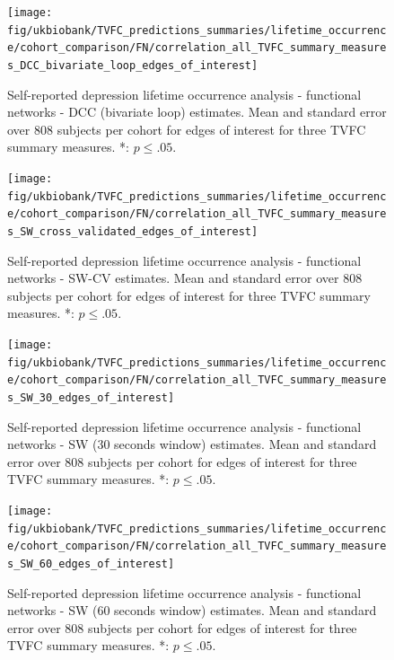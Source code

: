 \begin{figure}[h]
    \centering
    \texttt{[image: fig/ukbiobank/TVFC\_predictions\_summaries/lifetime\_occurrence/cohort\_comparison/FN/correlation\_all\_TVFC\_summary\_measures\_DCC\_bivariate\_loop\_edges\_of\_interest]}
    \caption{
        Self-reported depression lifetime occurrence analysis - functional networks - DCC (bivariate loop) estimates.
        Mean and standard error over 808 subjects per cohort for edges of interest for three TVFC summary measures.
        *: $p \leq .05$.
    }\label{fig:ukb-results-lo-fn-cohort-comparison-edges-of-interest-dcc-bl}
\end{figure}


\begin{figure}[h]
    \centering
    \texttt{[image: fig/ukbiobank/TVFC\_predictions\_summaries/lifetime\_occurrence/cohort\_comparison/FN/correlation\_all\_TVFC\_summary\_measures\_SW\_cross\_validated\_edges\_of\_interest]}
    \caption{
        Self-reported depression lifetime occurrence analysis - functional networks - SW-CV estimates.
        Mean and standard error over 808 subjects per cohort for edges of interest for three TVFC summary measures.
        *: $p \leq .05$.
    }\label{fig:ukb-results-lo-fn-cohort-comparison-edges-of-interest-sw-cv}
\end{figure}


\begin{figure}[h]
    \centering
    \texttt{[image: fig/ukbiobank/TVFC\_predictions\_summaries/lifetime\_occurrence/cohort\_comparison/FN/correlation\_all\_TVFC\_summary\_measures\_SW\_30\_edges\_of\_interest]}
    \caption{
        Self-reported depression lifetime occurrence analysis - functional networks - SW (30 seconds window) estimates.
        Mean and standard error over 808 subjects per cohort for edges of interest for three TVFC summary measures.
        *: $p \leq .05$.
    }\label{fig:ukb-results-lo-fn-cohort-comparison-edges-of-interest-sw-30}
\end{figure}


\begin{figure}[h]
    \centering
    \texttt{[image: fig/ukbiobank/TVFC\_predictions\_summaries/lifetime\_occurrence/cohort\_comparison/FN/correlation\_all\_TVFC\_summary\_measures\_SW\_60\_edges\_of\_interest]}
    \caption{
        Self-reported depression lifetime occurrence analysis - functional networks - SW (60 seconds window) estimates.
        Mean and standard error over 808 subjects per cohort for edges of interest for three TVFC summary measures.
        *: $p \leq .05$.
    }\label{fig:ukb-results-lo-fn-cohort-comparison-edges-of-interest-sw-60}
\end{figure}



